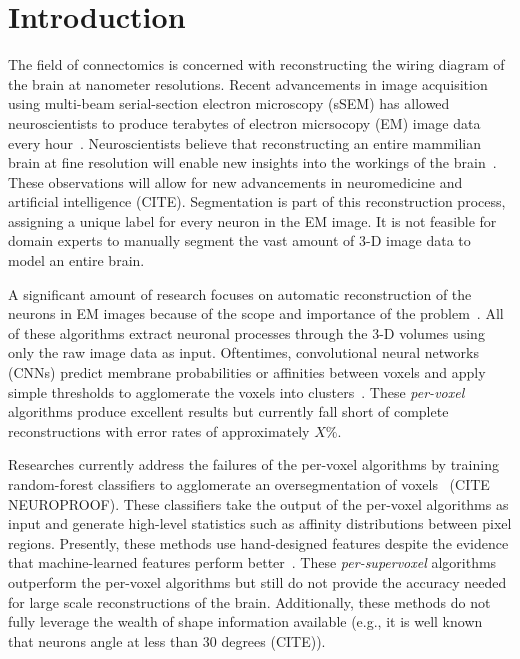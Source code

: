 \section{Introduction}

The field of connectomics is concerned with reconstructing the wiring diagram of the brain at nanometer resolutions. 
Recent advancements in image acquisition using multi-beam serial-section electron microscopy (sSEM) has allowed neuroscientists to produce terabytes of electron micrsocopy (EM) image data every hour~\cite{hildebrand2017whole}.
Neuroscientists believe that reconstructing an entire mammilian brain at fine resolution will enable new insights into the workings of the brain~\cite{kasthuri2015saturated}. 
These observations will allow for new advancements in neuromedicine and artificial intelligence (CITE). 
Segmentation is part of this reconstruction process, assigning a unique label for every neuron in the EM image. 
It is not feasible for domain experts to manually segment the vast amount of 3-D image data to model an entire brain.

A significant amount of research focuses on automatic reconstruction of the neurons in EM images because of the scope and importance of the problem~\cite{seymour2016rhoananet,nunez2014graph,parag2017anisotropic,zlateski2015image}.%
All of these algorithms extract neuronal processes through the 3-D volumes using only the raw image data as input.
Oftentimes, convolutional neural networks (CNNs) predict membrane probabilities or affinities between voxels and apply simple thresholds to agglomerate the voxels into clusters~\cite{lee2015recursive,ronneberger2015u}.
These \textit{per-voxel} algorithms produce excellent results but currently fall short of complete reconstructions with error rates of approximately $X\%$. %

Researches currently address the failures of the per-voxel algorithms by training random-forest classifiers to agglomerate an oversegmentation of voxels~\cite{nunez2014graph} (CITE NEUROPROOF). 
These classifiers take the output of the per-voxel algorithms as input and generate high-level statistics such as affinity distributions between pixel regions. 
Presently, these methods use hand-designed features despite the evidence that machine-learned features perform better~\cite{bogovic2013learned}. 
These \textit{per-supervoxel} algorithms outperform the per-voxel algorithms but still do not provide the accuracy needed for large scale reconstructions of the brain.
Additionally, these methods do not fully leverage the wealth of shape information available (e.g., it is well known that neurons angle at less than $30$ degrees (CITE)). %

